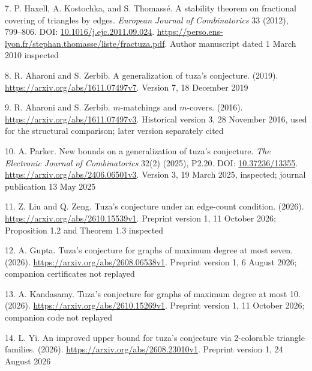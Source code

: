 \documentclass[11pt]{article}
\newenvironment{CSLReferences}[2]{\par\setlength{\parindent}{0pt}\setlength{\parskip}{6pt}}{}
\begin{document}
\begin{CSLReferences}{0}{1}
\par{}\label{ref-HKT2012}
7. P. Haxell, A. Kostochka, and S. Thomassé. A stability theorem on fractional covering of triangles by edges. \emph{European Journal of Combinatorics} 33 (2012), 799--806. DOI: \href{https://doi.org/10.1016/j.ejc.2011.09.024}{10.1016/j.ejc.2011.09.024}. \url{https://perso.ens-lyon.fr/stephan.thomasse/liste/fractuza.pdf}. Author manuscript dated 1 March 2010 inspected

\par{}\label{ref-AharoniZerbib2019}
8. R. Aharoni and S. Zerbib. A generalization of tuza's conjecture. (2019). \url{https://arxiv.org/abs/1611.07497v7}. Version 7, 18 December 2019

\par{}\label{ref-AharoniZerbib2016}
9. R. Aharoni and S. Zerbib. \(m\)-matchings and \(m\)-covers. (2016). \url{https://arxiv.org/abs/1611.07497v3}. Historical version 3, 28 November 2016, used for the structural comparison; later version separately cited

\par{}\label{ref-Parker2025}
10. A. Parker. New bounds on a generalization of tuza's conjecture. \emph{The Electronic Journal of Combinatorics} 32(2) (2025), P2.20. DOI: \href{https://doi.org/10.37236/13355}{10.37236/13355}. \url{https://arxiv.org/abs/2406.06501v3}. Version 3, 19 March 2025, inspected; journal publication 13 May 2025

\par{}\label{ref-LiuZeng2026}
11. Z. Liu and Q. Zeng. Tuza's conjecture under an edge-count condition. (2026). \url{https://arxiv.org/abs/2610.15539v1}. Preprint version 1, 11 October 2026; Proposition 1.2 and Theorem 1.3 inspected

\par{}\label{ref-Gupta2026}
12. A. Gupta. Tuza's conjecture for graphs of maximum degree at most seven. (2026). \url{https://arxiv.org/abs/2608.06538v1}. Preprint version 1, 6 August 2026; companion certificates not replayed

\par{}\label{ref-Kandasamy2026}
13. A. Kandasamy. Tuza's conjecture for graphs of maximum degree at most 10. (2026). \url{https://arxiv.org/abs/2610.15269v1}. Preprint version 1, 11 October 2026; companion code not replayed

\par{}\label{ref-Yi2026}
14. L. Yi. An improved upper bound for tuza's conjecture via 2-colorable triangle families. (2026). \url{https://arxiv.org/abs/2608.23010v1}. Preprint version 1, 24 August 2026


\end{CSLReferences}
\end{document}
